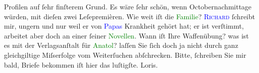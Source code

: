                Profilen auf ſehr finſterem Grund. Es wäre ſehr schön, wenn Octobernachmittage
               würden, mit dieſen zwei Leſepremièren. Wie weit iſt die \textcolor{green}{Familie}{}\ledrightnote{\textcolor{green}{Familie}}? \hspace*{2em}\textsc{\textcolor{blue}{Richard}{}\ledrightnote{\textcolor{blue}{Richard Beer-Hofmann}}}{ }ſchreibt mir, ungern und nur weil er von \textcolor{blue}{Papas}{} Krankheit gehört hat; er
               ist verſtimmt, arbeitet aber doch an einer ſeiner \textcolor{green}{Novellen}{}. Wann iſt Ihre Waffenübung? was ist es mit der
               Verlagsanſtalt für \textcolor{green}{Anatol}{}\ledrightnote{\textcolor{green}{Anatol}}? laſſen Sie ſich doch ja
               nicht durch ganz gleichgiltige Miſserfolge vom Weiterſuchen abſchrecken. Bitte,
               ſchreiben Sie mir bald, Briefe bekommen iſt hier das luſtigſte.\pend
           \pstart \spacefill\mbox{Loris.}\pend{}\endnumbering{}  
      